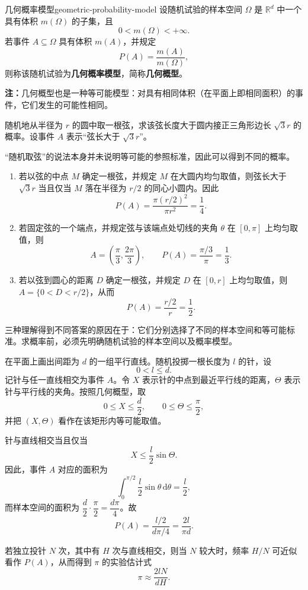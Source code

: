 \begin{mydefinition}{几何概率模型}{geometric-probability-model}
设随机试验的样本空间 $\Omega$ 是 $\mathbb{R}^d$ 中一个具有体积 $m(\Omega)$ 的子集，且
\[
0<m(\Omega)<+\infty.
\]
若事件 $A\subseteq\Omega$ 具有体积 $m(A)$，并规定
\[
P(A)=\dfrac{m(A)}{m(\Omega)},
\]
则称该随机试验为\textbf{几何概率模型}，简称\textbf{几何概型}。
\end{mydefinition}

\textbf{注：}几何概型也是一种等可能模型：对具有相同体积（在平面上即相同面积）的事件，它们发生的可能性相同。

\vspace{2\baselineskip}

\begin{example}[贝特朗奇论]
随机地从半径为 $r$ 的圆中取一根弦，求该弦长度大于圆内接正三角形边长 $\sqrt{3}r$ 的概率。设事件 $A$ 表示“弦长大于 $\sqrt{3}r$”。

“随机取弦”的说法本身并未说明等可能的参照标准，因此可以得到不同的概率。
\begin{enumerate}
\item 若以弦的中点 $M$ 确定一根弦，并规定 $M$ 在大圆内均匀取值，则弦长大于 $\sqrt{3}r$ 当且仅当 $M$ 落在半径为 $r/2$ 的同心小圆内。因此
\[
P(A)=\dfrac{\pi(r/2)^2}{\pi r^2}=\dfrac14.
\]

\item 若固定弦的一个端点，并规定弦与该端点处切线的夹角 $\theta$ 在 $[0,\pi]$ 上均匀取值，则
\[
A=\left(\dfrac{\pi}{3},\dfrac{2\pi}{3}\right),
\qquad
P(A)=\dfrac{\pi/3}{\pi}=\dfrac13.
\]

\item 若以弦到圆心的距离 $D$ 确定一根弦，并规定 $D$ 在 $[0,r]$ 上均匀取值，则 $A=\{0<D<r/2\}$，从而
\[
P(A)=\dfrac{r/2}{r}=\dfrac12.
\]
\end{enumerate}

三种理解得到不同答案的原因在于：它们分别选择了不同的样本空间和等可能标准。求概率前，必须先明确随机试验的样本空间以及概率模型。
\end{example}

\begin{example}[布丰投针实验]
在平面上画出间距为 $d$ 的一组平行直线。随机投掷一根长度为 $l$ 的针，设
\[
0<l\leq d.
\]
记针与任一直线相交为事件 $A$。令 $X$ 表示针的中点到最近平行线的距离，$\Theta$ 表示针与平行线的夹角。按照几何概型，取
\[
0\leq X\leq \dfrac d2,
\qquad
0\leq \Theta\leq \dfrac{\pi}{2},
\]
并把 $(X,\Theta)$ 看作在该矩形内等可能取值。

针与直线相交当且仅当
\[
X\leq \dfrac l2\sin\Theta.
\]
因此，事件 $A$ 对应的面积为
\[
\int_0^{\pi/2}\dfrac l2\sin\theta\,\mathrm{d}\theta
=\dfrac l2,
\]
而样本空间的面积为 $\dfrac d2\cdot\dfrac{\pi}{2}=\dfrac{d\pi}{4}$。故
\[
P(A)=\dfrac{l/2}{d\pi/4}=\dfrac{2l}{\pi d}.
\]

若独立投针 $N$ 次，其中有 $H$ 次与直线相交，则当 $N$ 较大时，频率 $H/N$ 可近似看作 $P(A)$，从而得到 $\pi$ 的实验估计式
\[
\pi\approx\dfrac{2lN}{dH}.
\]
\end{example}

